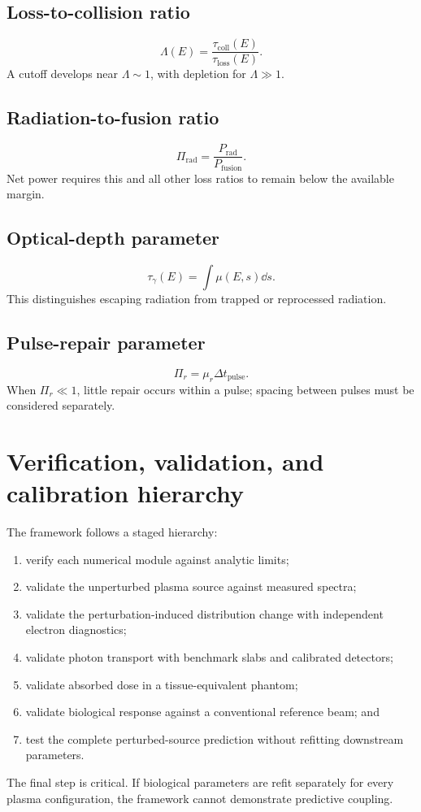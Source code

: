 \subsection{Loss-to-collision ratio}
\begin{equation}
\Lambda(E)=\frac{\tau_{\mathrm{coll}}(E)}{\tau_{\mathrm{loss}}(E)}.
\end{equation}
A cutoff develops near $\Lambda\sim1$, with depletion for $\Lambda\gg1$.

\subsection{Radiation-to-fusion ratio}
\begin{equation}
\Pi_{\mathrm{rad}}=\frac{P_{\mathrm{rad}}}{P_{\mathrm{fusion}}}.
\end{equation}
Net power requires this and all other loss ratios to remain below the available margin.

\subsection{Optical-depth parameter}
\begin{equation}
\tau_\gamma(E)=\int\mu(E,s)\dd s.
\end{equation}
This distinguishes escaping radiation from trapped or reprocessed radiation.

\subsection{Pulse-repair parameter}
\begin{equation}
\Pi_r=\mu_r\Delta t_{\mathrm{pulse}}.
\end{equation}
When $\Pi_r\ll1$, little repair occurs within a pulse; spacing between pulses must be considered separately.

\section{Verification, validation, and calibration hierarchy}

The framework follows a staged hierarchy:
\begin{enumerate}
\item verify each numerical module against analytic limits;
\item validate the unperturbed plasma source against measured spectra;
\item validate the perturbation-induced distribution change with independent electron diagnostics;
\item validate photon transport with benchmark slabs and calibrated detectors;
\item validate absorbed dose in a tissue-equivalent phantom;
\item validate biological response against a conventional reference beam; and
\item test the complete perturbed-source prediction without refitting downstream parameters.
\end{enumerate}
The final step is critical. If biological parameters are refit separately for every plasma configuration, the framework cannot demonstrate predictive coupling.

